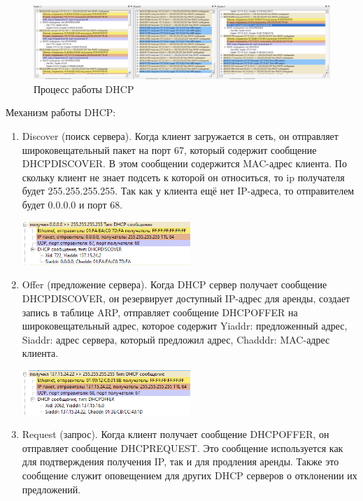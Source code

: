 \documentclass[12pt,onecolumn]{article}
\begin{document}
\begin{figure}[H]
    \centering
    \includegraphics[width=\textwidth]{image/part-4/dhcp.png}
    \caption{Процесс работы DHCP}
\end{figure}

Механизм работы DHCP:
\begin{enumerate}
    \item Discover (поиск сервера). Когда клиент загружается в сеть, он отправляет широковещательный пакет на порт 67, который содержит сообщение DHCPDISCOVER.
     В этом сообщении содержится MAC-адрес клиента. По скольку клиент не знает подсеть к которой он относиться, то ip получателя будет 255.255.255.255. Так как у клиента ещё нет IP-адреса, то отправителем будет 0.0.0.0 и порт 68.{
            
            \includegraphics*[width=0.5\textwidth]{image/part-4/discover.png}
     }
     \item Offer (предложение сервера). Когда DHCP сервер получает сообщение DHCPDISCOVER, он резервирует доступный IP-адрес для аренды, создает запись в таблице ARP, отправляет сообщение DHCPOFFER на широковещательный адрес, которое содержит Yiaddr: предложенный адрес, Siaddr: адрес сервера, который предложил адрес, Chadddr: MAC-адрес клиента.{
        
     \includegraphics*[width=0.5\textwidth]{image/part-4/offer.png}
     }
     \item Request (запрос). Когда клиент получает сообщение DHCPOFFER, он отправляет сообщение DHCPREQUEST. Это сообщение используется как для подтверждения получения IP, так и для продления аренды. Также это сообщение служит оповещением для других DHCP серверов о отклонении их предложений. {

}
\end{enumerate}
\end{document}
